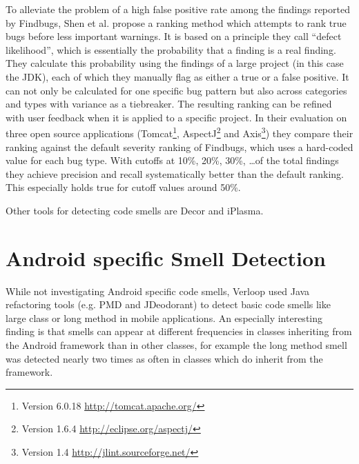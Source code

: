 To alleviate the problem of a high false positive rate among the findings reported by Findbugs, Shen et al. \cite{shen2011efindbugs} propose a ranking method which attempts to rank true bugs before less important warnings.
It is based on a principle they call ``defect likelihood'', which is essentially the probability that a finding is a real finding.
They calculate this probability using the findings of a large project (in this case the JDK), each of which they manually flag as either a true or a false positive.
It can not only be calculated for one specific bug pattern but also across categories and types with variance as a tiebreaker.
The resulting ranking can be refined with user feedback when it is applied to a specific project.
In their evaluation on three open source applications
(Tomcat\footnote{Version 6.0.18 \url{http://tomcat.apache.org/}}, AspectJ\footnote{Version 1.6.4 \url{http://eclipse.org/aspectj/}} and Axis\footnote{Version 1.4 \url{http://jlint.sourceforge.net/}})
they compare their ranking against the default severity ranking of Findbugs, which uses a hard-coded value for each bug type.
With cutoffs at 10\%, 20\%, 30\%, \ldots of the total findings they achieve precision and recall systematically better than the default ranking.
This especially holds true for cutoff values around 50\%.


Other tools for detecting code smells are Decor\cite{moha2010decor} and iPlasma\cite{Marinescu2005iPlasmaAI}.

\section{Android specific Smell Detection}


While not investigating Android specific code smells, Verloop \cite{verloop2013code} used Java refactoring tools (e.g. PMD and JDeodorant) to detect basic code smells like large class or long method in mobile applications.
An especially interesting finding is that smells can appear at different frequencies in classes inheriting from the Android framework than in other classes, for example the long method smell was detected nearly two times as often in classes which do inherit from the framework.

